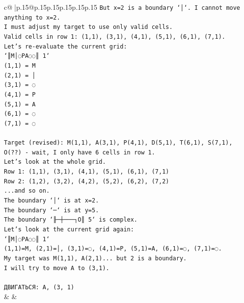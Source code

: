 \documentclass{article}
\begin{document}
{\begin{supertabular}{c@{$\;$}|p{.15\linewidth}@{}p{.15\linewidth}p{.15\linewidth}p{.15\linewidth}p{.15\linewidth}p{.15\linewidth}}
{{{\texttt{But x=2 is a boundary `│`. I cannot move anything to x=2.} \\
\texttt{I must adjust my target to use only valid cells.} \\
\texttt{Valid cells in row 1: (1,1), (3,1), (4,1), (5,1), (6,1), (7,1).} \\
\texttt{Let's re{-}evaluate the current grid:} \\
\texttt{`║M│◌PA◌◌║ 1`} \\
\texttt{(1,1) = M} \\
\texttt{(2,1) = │} \\
\texttt{(3,1) = ◌} \\
\texttt{(4,1) = P} \\
\texttt{(5,1) = A} \\
\texttt{(6,1) = ◌} \\
\texttt{(7,1) = ◌} \\
\\ 
\texttt{Target (revised): M(1,1), A(3,1), P(4,1), D(5,1), T(6,1), S(7,1), O(??) {-} wait, I only have 6 cells in row 1.} \\
\texttt{Let's look at the whole grid.} \\
\texttt{Row 1: (1,1), (3,1), (4,1), (5,1), (6,1), (7,1)} \\
\texttt{Row 2: (1,2), (3,2), (4,2), (5,2), (6,2), (7,2)} \\
\texttt{...and so on.} \\
\texttt{The boundary `│` is at x=2.} \\
\texttt{The boundary `─` is at y=5.} \\
\texttt{The boundary `╟─┼───┐O║ 5` is complex.} \\
\texttt{Let's look at the current grid again:} \\
\texttt{`║M│◌PA◌◌║ 1`} \\
\texttt{(1,1)=M, (2,1)=│, (3,1)=◌, (4,1)=P, (5,1)=A, (6,1)=◌, (7,1)=◌.} \\
\texttt{My target was M(1,1), A(2,1)... but 2 is a boundary.} \\
\texttt{I will try to move A to (3,1).} \\
\\ 
\texttt{ДВИГАТЬСЯ: A, (3, 1)} \\
            }
        }
    }
    & & \\ \\


\end{supertabular}}
\end{document}
